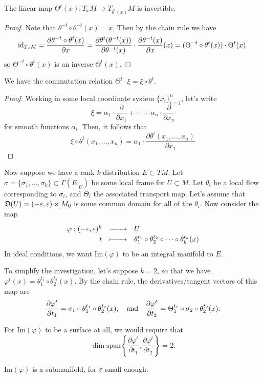 \documentclass{lkx_paper}
\begin{document}
\begin{claim*}
	The linear map $\Theta^t(x) : T_x M \to T_{\theta^t(x)} M$ is invertible.
\end{claim*}

\begin{proof}
	Note that $\theta^{-t}\circ \theta^{-t}(x)=x$. Then by the chain rule we have
	\[
		\mathrm{id}_{T_x M}=\frac{\partial \theta^{-t} \circ \theta^{t}(x)}{\partial x} = \frac{\partial \theta^t(\theta^{-t}(x))}{\partial \theta^{-t}(x)}\cdot \frac{\partial \theta^{-t}(x)}{\partial x}(x) = (\Theta^{-t} \circ\theta^{t}(x))\cdot\Theta^{t}(x),
	\]
	so $\Theta^{-t}\circ \theta^t(x)$ is an inverse $\Theta^t(x)$.
\end{proof}

\begin{claim*}
	We have the commutation relation $\Theta^t\cdot \xi = \xi\circ \theta^t$.
\end{claim*}

\begin{proof}
	Working in some local coordinate system $\{x_i\}^n_{i=1}$, let's write
	\[
		\xi = \alpha_1\cdot \frac{\partial}{\partial x_1} + \cdots + \alpha_n \cdot \frac{\partial}{\partial x_n}
	\]
	for smooth functions $\alpha_i$. Then, it follows that
	\[
		\xi\circ \theta^t(x_1,\ldots, x_n) = \alpha_1\cdot \frac{\partial \theta^t(x_1,\ldots, x_n)}{\partial x_1}
	\]
\end{proof}

Now suppose we have a rank $k$ distribution $E\subset TM$. Let $\sigma=\{\sigma_1,\ldots,\sigma_k\}\subset \Gamma(E|_U)$ be some local frame for $U\subset M$.
Let $\theta_i$ be a local flow corresponding to $\sigma_i$, and $\Theta_i$ the associated transport map. Let's assume that $\mathfrak{D}(U) = (-\varepsilon,\varepsilon)\times M_0$ is some common domain for all of the $\theta_i$. Now consider the map
\[
	\definefunction{\varphi}{(-\eps, \eps)^k}{U}{t}{\theta^{t_1}_1\circ \theta^{t_2}_2\circ\cdots\circ \theta^{t_k}_k(x)}
\]
In ideal conditions, we want $\textrm{Im}(\varphi)$ to be an integral manifold to $E$.

To simplify the investigation, let's suppose $k=2$, so that we have $\varphi^t(x) = \theta_1^{t_1}\circ \theta_2^{t_2}(x)$. By the chain rule, the derivatives/tangent vectors of this map are
\[
	\frac{\partial \varphi^t}{\partial t_1} = \sigma_1\circ \theta^{t_1}_1\circ \theta^{t_2}_2(x),\quad\textrm{and}\quad\frac{\partial \varphi^t}{\partial t_2} = \Theta^{t_1}_1\circ \sigma_2\circ \theta_2^{t_2}(x).
\]

For $\textrm{Im}(\varphi)$ to be a surface at all, we would require that
\[
	\dim\textrm{span}\left\{\frac{\partial \varphi^t}{\partial t_1}, \frac{\partial \varphi^t}{\partial t_2}\right\} = 2.
\]
\begin{claim*}
	$\textrm{Im}(\varphi)$ is a submanifold, for $\varepsilon$ small enough.
\end{claim*}
\end{document}
